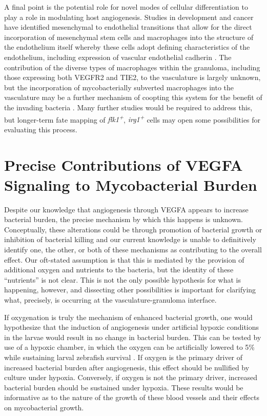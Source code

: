 A final point is the potential role for novel modes of cellular differentiation to play a role in modulating host angiogenesis. Studies in development and cancer have identified mesenchymal to endothelial transitions that allow for the direct incorporation of mesenchymal stem cells and macrophages into the structure of the endothelium itself whereby these cells adopt defining characteristics of the endothelium, including expression of vascular endothelial cadherin \citep{Ubil2014, Wu2007, Zhang2008b}. The contribution of the diverse types of macrophages within the granuloma, including those expressing both VEGFR2 and TIE2, to the vasculature is largely unknown, but the incorporation of mycobacterially subverted macrophages into the vasculature may be a further mechanism of coopting this system for the benefit of the invading bacteria \citep{deCortie2014, Hall2012}. Many further studies would be required to address this, but longer\hyp{}term fate mapping of \textit{flk1\textsuperscript{+}}, \textit{irg1\textsuperscript{+}} cells may open some possibilities for evaluating this process.

\section{Precise Contributions of VEGFA Signaling to Mycobacterial Burden}

Despite our knowledge that angiogenesis through VEGFA appears to increase bacterial burden, the precise mechanism by which this happens is unknown. Conceptually, these alterations could be through promotion of bacterial growth or inhibition of bacterial killing and our current knowledge is unable to definitively identify one, the other, or both of these mechanisms as contributing to the overall effect. Our oft\hyp{}stated assumption is that this is mediated by the provision of additional oxygen and nutrients to the bacteria, but the identity of these ``nutrients'' is not clear. This is not the only possible hypothesis for what is happening, however, and dissecting other possibilities is important for clarifying what, precisely, is occurring at the vasculature\hyp{}granuloma interface. 

If oxygenation is truly the mechanism of enhanced bacterial growth, one would hypothesize that the induction of angiogenesis under artificial hypoxic conditions in the larvae would result in no change in bacterial burden. This can be tested by use of a hypoxic chamber, in which the oxygen can be artificially lowered to 5\% while sustaining larval zebrafish survival \citep{Rombough2009, Long2015}. If oxygen is the primary driver of increased bacterial burden after angiogenesis, this effect should be nullified by culture under hypoxia. Conversely, if oxygen is not the primary driver, increased bacterial burden should be sustained under hypoxia. These results would be informative as to the nature of the growth of these blood vessels and their effects on mycobacterial growth.

